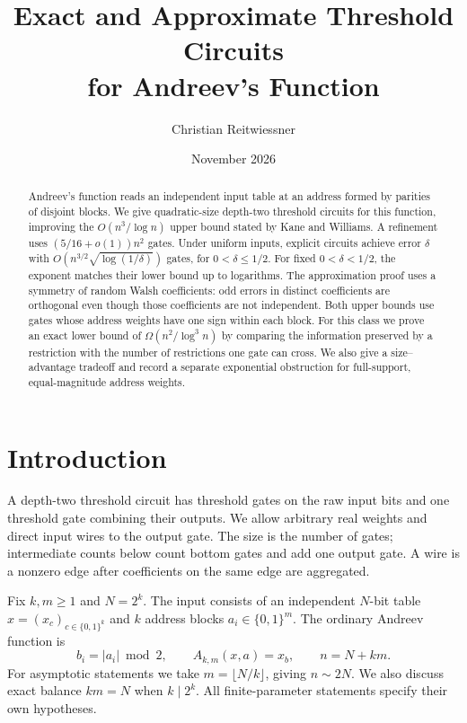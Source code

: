 \documentclass[11pt]{article}
\title{Exact and Approximate Threshold Circuits\\for Andreev's Function}
\author{Christian Reitwiessner}
\date{November 2026}
\newcommand{\bits}{\{0,1\}}
\begin{document}
\maketitle
\begin{abstract}
Andreev's function reads an independent input table at an address formed
by parities of disjoint blocks. We give quadratic-size depth-two threshold
circuits for this function, improving the $O(n^3/\log n)$ upper bound
stated by Kane and Williams. A refinement uses $(5/16+o(1))n^2$ gates.
Under uniform inputs, explicit circuits achieve error $\delta$ with
$O(n^{3/2}\sqrt{\log(1/\delta)})$ gates, for $0<\delta\le1/2$.
For fixed $0<\delta<1/2$, the exponent matches their lower bound up to logarithms.
The approximation proof uses a symmetry of random Walsh coefficients:
odd errors in distinct coefficients are orthogonal even though those
coefficients are not independent. Both upper bounds use gates whose
address weights have one sign within each block. For this class we prove
an exact lower bound of $\Omega(n^2/\log^3 n)$ by comparing the information
preserved by a restriction with the number of restrictions one gate can
cross. We also give a size--advantage tradeoff and record a separate
exponential obstruction for full-support, equal-magnitude address weights.
\end{abstract}

\section{Introduction}
A depth-two threshold circuit has threshold gates on the raw input bits
and one threshold gate combining their outputs. We allow arbitrary real
weights and direct input wires to the output gate. The size is the number
of gates; intermediate counts below count bottom gates and add one output
gate. A wire is a nonzero edge after coefficients on the same edge are
aggregated.

Fix $k,m\ge1$ and $N=2^k$. The input consists of an independent $N$-bit
table $x=(x_c)_{c\in\bits^k}$ and $k$ address blocks $a_i\in\bits^m$.
The ordinary Andreev function is
$$
b_i=|a_i|\bmod2,\qquad A_{k,m}(x,a)=x_b,\qquad n=N+km.
$$
For asymptotic statements we take $m=\lfloor N/k\rfloor$, giving $n\sim2N$.
We also discuss exact balance $km=N$ when $k\mid2^k$. All finite-parameter
statements specify their own hypotheses.
\end{document}
